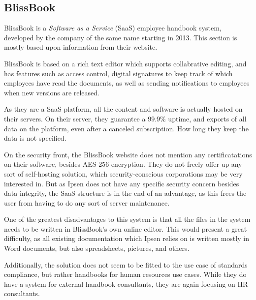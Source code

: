 \subsection{BlissBook}
BlissBook is a \textit{Software as a Service} (SaaS) employee handbook system, developed by the company of the same name starting in 2013\cite{BlissbookInfo}.
This section is mostly based upon information from their website\cite{BlissbookContents}.

BlissBook is based on a rich text editor which supports collabrative editing, and has features such as access control, digital signatures to keep track of which employees have read the documents, as well as sending notifications to employees when new versions are released.

As they are a SaaS platform, all the content and software is actually hosted on their servers.
On their server, they guarantee a 99.9\% uptime, and exports of all data on the platform, even after a canceled subscription.
How long they keep the data is not specified.

On the security front, the BlissBook website does not mention any certificatations on their software, besides  AES-256 encryption.\cite{BlissbookSecurity}
They do not freely offer up any sort of self-hosting solution, which security-conscious corporations may be very interested in.
But as Ipsen does not have any specific security concern besides data integrity, the SaaS structure is in the end of an advantage, as this frees the user from having to do any sort of server maintenance.

One of the greatest disadvantages to this system is that all the files in the system needs to be written in BlissBook's own online editor.
This would present a great difficulty, as all existing documentation which Ipsen relies on is written mostly in Word documents, but also spreadsheets, pictures, and others.

Additionally, the solution does not seem to be fitted to the use case of standards compliance, but rather handbooks for human resources use cases.
While they do have a system for external handbook consultants, they are again focusing on HR consultants.\cite{BlissbookHandbook}
